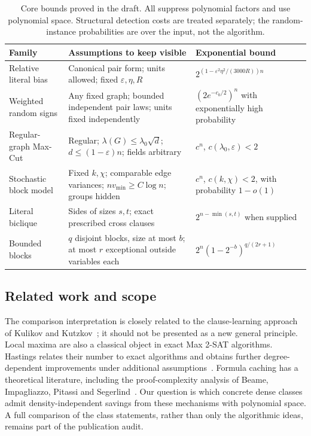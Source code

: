 \documentclass[11pt,a4paper]{article}
\theoremstyle{definition}
\theoremstyle{remark}
\begin{document}
\begin{table}[t]
\centering\small
\begin{tabular}{@{}p{}p{}p{}@{}}
\toprule
Family & Assumptions to keep visible & Exponential bound \\
\midrule
Relative literal bias & Canonical pair form; units allowed; fixed
$\varepsilon,\eta,R$ & $2^{(1-\varepsilon^2\eta^2/(3000R))n}$ \\
Weighted random signs & Any fixed graph; bounded independent pair laws;
units fixed independently & $(2e^{-c_0/2})^n$ with exponentially high probability \\
Regular-graph Max-Cut & Regular; $\lambda(G)\le\lambda_0\sqrt d$;
$d\le(1-\varepsilon)n$; fields arbitrary & $c^n$, $c(\lambda_0,\varepsilon)<2$ \\
Stochastic block model & Fixed $k,\chi$; comparable edge variances;
$n v_{\min}\ge C\log n$; groups hidden & $c^n$, $c(k,\chi)<2$, with probability $1-o(1)$ \\
Literal biclique & Sides of sizes $s,t$; exact prescribed cross clauses &
$2^{n-\min(s,t)}$ when supplied \\
Bounded blocks & $q$ disjoint blocks, size at most $b$; at most $r$
exceptional outside variables each &
$2^n(1-2^{-b})^{q/(2r+1)}$ \\
\bottomrule
\end{tabular}
\caption{Core bounds proved in the draft. All suppress polynomial factors
and use polynomial space. Structural detection costs are treated separately;
the random-instance probabilities are over the input, not the algorithm.}
\label{tab:main}
\end{table}

\subsection{Related work and scope}

The comparison interpretation is closely related to the clause-learning
approach of Kulikov and Kutzkov~\cite{KK}; it should not be presented as a
new general principle. Local maxima are also a classical object in exact
Max 2-SAT algorithms. Hastings relates their number to exact algorithms and
obtains further degree-dependent improvements under additional
assumptions~\cite{Hastings}. Formula caching has a theoretical literature,
including the proof-complexity analysis of Beame, Impagliazzo, Pitassi and
Segerlind~\cite{BIPS}. Our question is which concrete dense classes admit
density-independent savings from these mechanisms with polynomial space.
A full comparison of the class statements, rather than only the algorithmic
ideas, remains part of the publication audit.
\end{document}
